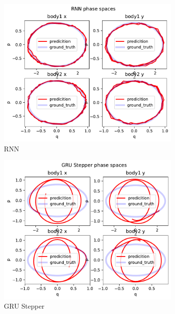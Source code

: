 \begin{figure}[H]
	\begin{subfigure}[b]{0.3\textwidth}
		\centering
		\includegraphics[width=\textwidth]{chapters/chapter5/body2_rnn_ps.pdf}
		\caption{RNN}
	\end{subfigure}
	\hfill
	\begin{subfigure}[b]{0.3\textwidth}
		\centering
		\includegraphics[width=\textwidth]{chapters/chapter5/body2_gre_ps.pdf}
		\caption{GRU Stepper}
	\end{subfigure}
	\hfill
	\begin{subfigure}[b]{0.3\textwidth}

\end{subfigure}
\end{figure}
